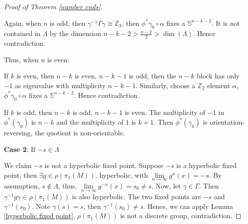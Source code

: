 \documentclass[12pt]{amsart}
\theoremstyle{definition}
\begin{document}
\begin{proof}[Proof of Theorem \ref{number ends}]
\begin{itemize}
    Again, when $n$ is odd, then $\gamma^{-1}\Gamma\gamma\cong \mathbb{Z}_2$, then $\phi^*\gamma_0\circ\alpha$ fixes a $\mathbb{S}^{n-k-2}$. It is not contained in $\Lambda$ by the dimension $n-k-2>\frac{n-2}{2}> \operatorname{dim}(\Lambda)$. Hence contradiction.
    
    Thus, when $n$ is even:
    
    If $k$ is even, then $n-k$ is even, $n-k-1$ is odd, then the $n-k$ block has only $-1$ as eigenvalue with multiplicity $n-k-1$. Similarly, choose a $\mathbb{Z}_2$ element $\alpha$, $\phi^*\gamma_0\circ\alpha$ fixes a $\mathbb{S}^{n-k-2}$. Hence contradiction.
    
    If $k$ is odd, then $n-k$ is odd, $n-k-1$ is even. The multiplicity of $-1$ in $\phi^*(\gamma_0)$ is $n-k$ and the multiplicity of $1$ is $k+1$. Then $\phi^*(\gamma_0)$ is orientation-reversing, the quotient is non-orientable.
\end{itemize}

\textbf{Case 2}: If $-s\in\Lambda$

We claim $-s$ is not a hyperbolic fixed point. Suppose $-s$ is a hyperbolic fixed point, then $\exists g \in \rho(\pi_1(M))$, hyperbolic, with $\lim\limits_{n\to\infty} g^n(x) = -s$. By assumption, $s\notin \Lambda$, thus, $\lim\limits_{n\to\infty}g^{-n}(x) = s_0\neq s$. Now, let $\gamma\in \Gamma$. Then $\gamma^{-1}g\gamma \in \rho(\pi_1(M))$ is also hyperbolic. The two fixed points are $-s$ and $\gamma^{-1}(s_0)$. Note $\gamma(s) = s$, then $\gamma^{-1}(s_0)\neq s$. Hence, we can apply Lemma \ref{hyperbolic fixed point}, $\rho(\pi_1(M))$ is not a discrete group, contradiction.
\end{proof}






\end{document}
